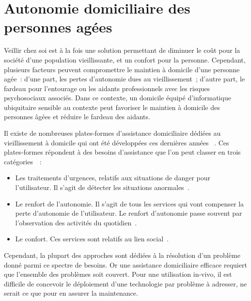 \section{Autonomie domiciliaire des personnes agées}

Veillir chez soi est à la fois une solution permettant de diminuer le
coût pour la société d'une population vieillissante, et un confort
pour la personne. Cependant, plusieurs facteurs peuvent compromettre
le maintien à domicile d'une personne agée~: d'une part, les pertes
d'autonomie dues au vieillissement~; d'autre part, le fardeau pour
l'entourage ou les aidants professionnels avec les risques
psychosociaux associés. Dans ce contexte, un domicile équipé
d'informatique ubiquitaire sensible au contexte peut favoriser le
maintien à domicile des personnes âgées et réduire le fardeau des
aidants.

Il existe de nombreuses plates-formes d'assistance domiciliaire dédiées au 
vieillissement à domicile qui ont été développées ces dernières années
~\parencite{chan2008review,rashidi2013survey}. 
Ces plates-formes répondent à des besoins d'assistance que l'on peut classer en 
trois catégories~\parencite{nehmer2006living}~: 
\begin{itemize}
\item Les traitements d'urgences, relatifs aux situations de danger pour l'utilisateur. Il s'agit de détecter les situations anormales~\parencite{hoque2015holmes}.
\item Le renfort de l'autonomie. Il s'agit de tous les services qui vont compenser la perte d'autonomie de l'utilisateur. Le renfort d'autonomie passe souvent par l'observation des activités du quotidien~\parencite{lee2015sensor}.
\item Le confort. Ces services sont relatifs au lien social~\parencite{baecker2014technology}. 
\end{itemize}
Cependant, la plupart des approches sont dédiées à la résolution d'un
problème donné parmi ce spectre de besoins. Or une assistance
domiciliaire efficace requiert que l'ensemble des problèmes soit
couvert. Pour une utilisation in-vivo, il est difficile de concevoir
le déploiement d'une technologie par problème à adresser, ne serait ce
que pour en assurer la maintenance.


